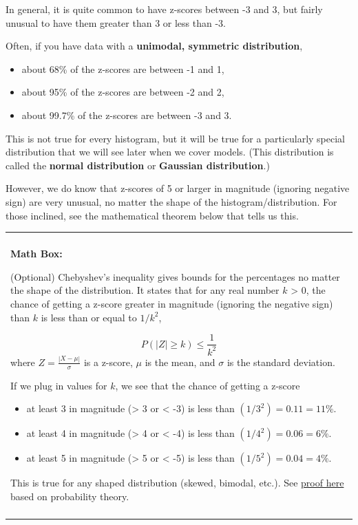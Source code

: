 \documentclass[
]{book}
\providecommand{\tightlist}{%
  \setlength{\itemsep}{0pt}\setlength{\parskip}{0pt}}
\newenvironment{mathbox}
{
    \begin{center}
    
    \begin{tabular}{|p{0.8\textwidth}|}
    \rowcolor{LightYellow}
    \hline\\
    \rowcolor{LightYellow}
    \textbf{Math Box:}
}
{
    \\\rowcolor{LightYellow}
    \\\hline
    \end{tabular} 
    \end{center}
}
\begin{document}
In general, it is quite common to have z-scores between -3 and 3, but fairly unusual to have them greater than 3 or less than -3.

Often, if you have data with a \textbf{unimodal, symmetric distribution},

\begin{itemize}
\tightlist
\item
  about 68\% of the z-scores are between -1 and 1,
\item
  about 95\% of the z-scores are between -2 and 2,
\item
  about 99.7\% of the z-scores are between -3 and 3.
\end{itemize}

This is not true for every histogram, but it will be true for a particularly special distribution that we will see later when we cover models. (This distribution is called the \textbf{normal distribution} or \textbf{Gaussian distribution}.)

However, we do know that z-scores of 5 or larger in magnitude (ignoring negative sign) are very unusual, no matter the shape of the histogram/distribution. For those inclined, see the mathematical theorem below that tells us this.

\begin{mathbox}
(Optional) Chebyshev's inequality gives bounds for the percentages no
matter the shape of the distribution. It states that for any real number
\(k\) \textgreater{} 0, the chance of getting a z-score greater in
magnitude (ignoring the negative sign) than \(k\) is less than or equal
to \(1/k^2\),

\[P\left(|Z| \geq k\right) \leq \frac{1}{k^2}\] where
\(Z = \frac{|X - \mu|}{\sigma}\) is a z-score, \(\mu\) is the mean, and
\(\sigma\) is the standard deviation.

If we plug in values for \(k\), we see that the chance of getting a
z-score

\begin{itemize}
\tightlist
\item
  at least 3 in magnitude (\textgreater{} 3 or \textless{} -3) is less
  than \((1/3^2) = 0.11 = 11\%\).
\item
  at least 4 in magnitude (\textgreater{} 4 or \textless{} -4) is less
  than \((1/4^2) = 0.06 = 6\%\).
\item
  at least 5 in magnitude (\textgreater{} 5 or \textless{} -5) is less
  than \((1/5^2) = 0.04 = 4\%\).
\end{itemize}

This is true for any shaped distribution (skewed, bimodal, etc.). See
\href{https://en.wikipedia.org/wiki/Markov\%27s_inequality}{proof here}
based on probability theory.
\end{mathbox}
\end{document}
